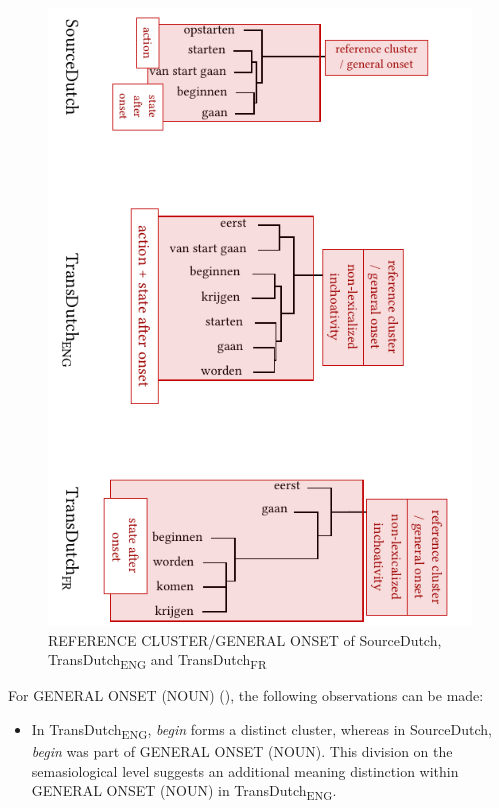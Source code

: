 \begin{figure}
\includegraphics[width=\textwidth]{figures/tree87.pdf}
\caption{\label{fig:4:84}  REFERENCE CLUSTER/GENERAL ONSET of SourceDutch, TransDutch\textsubscript{ENG} and TransDutch\textsubscript{FR}}
\end{figure}

For GENERAL ONSET (NOUN) (), the following observations can be made:

\begin{itemize}
\item  In TransDutch\textsubscript{ENG}, \textit{begin} forms a distinct cluster, whereas in SourceDutch, \textit{begin} was part of GENERAL ONSET (NOUN). This division on the semasiological level suggests an additional meaning distinction within GENERAL ONSET (NOUN) in TransDutch\textsubscript{ENG}.
\end{itemize}

